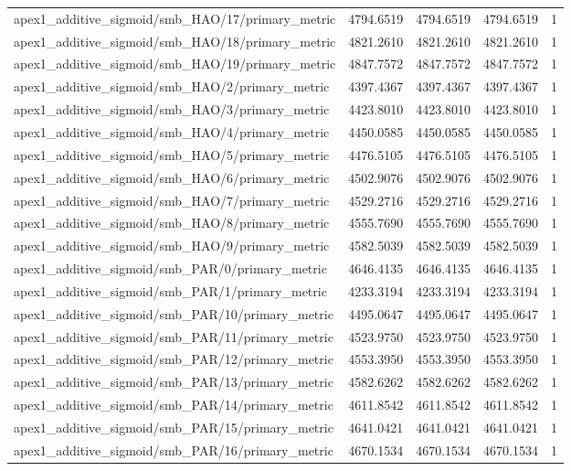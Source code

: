 \begin{table}[h]
\begin{tabular}{lrrrr}
apex1_additive_sigmoid/smb_HAO/17/primary_metric & 4794.6519 & 4794.6519 & 4794.6519 & 1 \\
apex1_additive_sigmoid/smb_HAO/18/primary_metric & 4821.2610 & 4821.2610 & 4821.2610 & 1 \\
apex1_additive_sigmoid/smb_HAO/19/primary_metric & 4847.7572 & 4847.7572 & 4847.7572 & 1 \\
apex1_additive_sigmoid/smb_HAO/2/primary_metric & 4397.4367 & 4397.4367 & 4397.4367 & 1 \\
apex1_additive_sigmoid/smb_HAO/3/primary_metric & 4423.8010 & 4423.8010 & 4423.8010 & 1 \\
apex1_additive_sigmoid/smb_HAO/4/primary_metric & 4450.0585 & 4450.0585 & 4450.0585 & 1 \\
apex1_additive_sigmoid/smb_HAO/5/primary_metric & 4476.5105 & 4476.5105 & 4476.5105 & 1 \\
apex1_additive_sigmoid/smb_HAO/6/primary_metric & 4502.9076 & 4502.9076 & 4502.9076 & 1 \\
apex1_additive_sigmoid/smb_HAO/7/primary_metric & 4529.2716 & 4529.2716 & 4529.2716 & 1 \\
apex1_additive_sigmoid/smb_HAO/8/primary_metric & 4555.7690 & 4555.7690 & 4555.7690 & 1 \\
apex1_additive_sigmoid/smb_HAO/9/primary_metric & 4582.5039 & 4582.5039 & 4582.5039 & 1 \\
apex1_additive_sigmoid/smb_PAR/0/primary_metric & 4646.4135 & 4646.4135 & 4646.4135 & 1 \\
apex1_additive_sigmoid/smb_PAR/1/primary_metric & 4233.3194 & 4233.3194 & 4233.3194 & 1 \\
apex1_additive_sigmoid/smb_PAR/10/primary_metric & 4495.0647 & 4495.0647 & 4495.0647 & 1 \\
apex1_additive_sigmoid/smb_PAR/11/primary_metric & 4523.9750 & 4523.9750 & 4523.9750 & 1 \\
apex1_additive_sigmoid/smb_PAR/12/primary_metric & 4553.3950 & 4553.3950 & 4553.3950 & 1 \\
apex1_additive_sigmoid/smb_PAR/13/primary_metric & 4582.6262 & 4582.6262 & 4582.6262 & 1 \\
apex1_additive_sigmoid/smb_PAR/14/primary_metric & 4611.8542 & 4611.8542 & 4611.8542 & 1 \\
apex1_additive_sigmoid/smb_PAR/15/primary_metric & 4641.0421 & 4641.0421 & 4641.0421 & 1 \\
apex1_additive_sigmoid/smb_PAR/16/primary_metric & 4670.1534 & 4670.1534 & 4670.1534 & 1 \\

\end{tabular}
\end{table}
